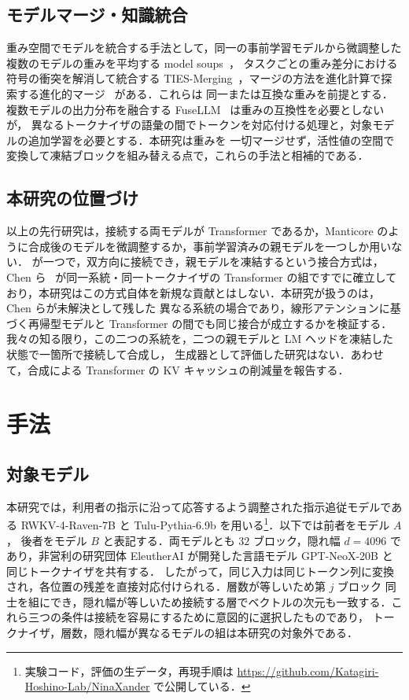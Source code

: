 \documentclass[techrep,noauthor]{ipsj}
\newcommand{\rev}[1]{{\color{blue}#1}}
\newcommand{\revr}[1]{{\color{red}#1}}
\newcommand{\revp}[1]{{\color{violet}#1}}
\begin{document}
\subsection{モデルマージ・知識統合}
重み空間でモデルを統合する手法として，同一の事前学習モデルから微調整した複数のモデルの重みを平均する model soups~\cite{pmlr-v162-wortsman22a}，
タスクごとの重み差分における符号の衝突を解消して統合する TIES-Merging~\cite{3666122.3666432}，マージの方法を進化計算で探索する進化的マージ~\cite{Akiba2025} がある．これらは
同一または互換な重みを前提とする．複数モデルの出力分布を融合する FuseLLM~\cite{wan2024knowledge} は重みの互換性を必要としないが，
\rev{異なるトークナイザの語彙の間でトークンを対応付ける処理と，対象モデルの追加学習}を必要とする．本研究は重みを
一切マージせず，活性値の空間で\rev{変換}して凍結ブロックを組み替える点で，これらの手法と相補的である．

\subsection{\revr{本研究の位置づけ}}
以上の先行研究は，接続する両モデルが Transformer であるか，Manticore のように合成後のモデルを微調整するか，事前学習済みの親モデルを一つしか用いない．
\rev{\revp{接続箇所}が一つで}，双方向に接続でき，親モデルを凍結するという接合方式は，Chen ら~\cite{chen2025transferring} が同一系統・同一トークナイザの
Transformer の組ですでに確立しており，本研究はこの方式自体を新規な貢献とはしない．本研究が扱うのは，Chen らが未解決として残した
異なる系統の場合であり，\rev{線形アテンション}に基づく再帰型モデルと Transformer の間でも同じ接合が成立するかを検証する．
我々の知る限り，この二つの系統を，\rev{二つの親モデル}と LM ヘッドを凍結した状態で一箇所で接続して合成し，
生成器として評価した研究はない．あわせて，合成による Transformer の KV キャッシュの削減量を報告する．

\section{手法}\label{sec:method}
\subsection{対象モデル}
本研究では，\rev{利用者の指示に沿って応答するよう調整された}指示追従モデルである RWKV-4-Raven-7B と Tulu-Pythia-6.9b を用いる\rev{\footnote{実験コード，評価の生データ，再現手順は \url{https://github.com/Katagiri-Hoshino-Lab/NinaXander} で公開している．}}．以下では前者をモデル $A$，
後者をモデル $B$ と表記する．両モデルとも $32$ ブロック，隠れ幅 $d{=}4096$ であり，\rev{非営利の研究団体 EleutherAI が開発した}言語モデル GPT-NeoX-20B と同じトークナイザを共有する．
したがって，同じ入力は同じトークン列に変換され，各位置の残差を直接対応付けられる．層数が等しいため第 $j$ ブロック
同士を組にでき，隠れ幅が等しいため\revp{接続する層}でベクトルの次元も一致する．これら三つの条件は接続を容易にするために意図的に選択したものであり，
トークナイザ，層数，隠れ幅が異なるモデルの組は本研究の対象外である．
\end{document}
